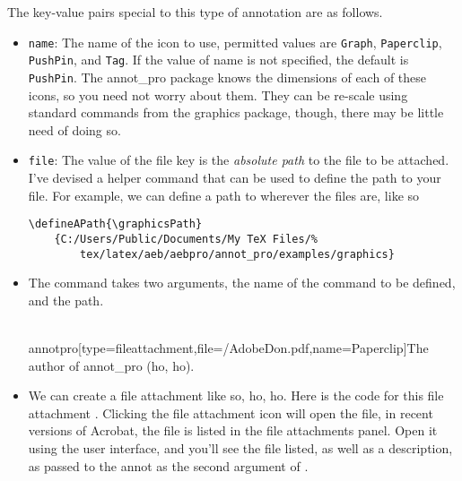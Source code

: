 \documentclass[12pt]{article}
\begin{document}
The key-value pairs special to this type of annotation are as follows.

\begin{itemize}
    \item\texttt{name}: The name of the icon to use, permitted values are
    \texttt{Graph}, \texttt{Paperclip}, \texttt{PushPin}, and \texttt{Tag}. If the value of name is not
    specified, the default is \texttt{PushPin}. The annot\_pro package knows the dimensions of each of these
    icons, so you need not worry about them. They can be re-scale using standard commands from the graphics package,
    though, there may be little need of doing so.
    \item \texttt{file}: The value of the file key is the \emph{absolute path} to the file to be attached. I've
    devised a helper command  that can be used to define the path to your file. For example, we can
    define a path to wherever the files are, like so
\begin{Verbatim}[fontsize=\footnotesize]
  \defineAPath{\graphicsPath}
    {C:/Users/Public/Documents/My TeX Files/%
        tex/latex/aeb/aebpro/annot_pro/examples/graphics}
\end{Verbatim}
\item[] The command takes two arguments, the name of the command to be defined, and the path.


\begin{defineJS}{\fa}
\\annotpro[type=fileattachment,file={\graphicsPath/AdobeDon.pdf},name=Paperclip]{The author of annot\_pro (ho, ho).}
\end{defineJS}

\item[] We can create a file attachment
     like so, ho, ho. Here is the code
    for this file attachment \annotpro[name=Star]{\fa}. Clicking the
    file attachment icon will open the file, in recent versions of
    Acrobat, the file is listed in the file attachments panel. Open it
    using the user interface, and you'll see the file listed, as well
    as a description, as passed to the annot as the second argument of
    .
\end{itemize}
\end{document}
